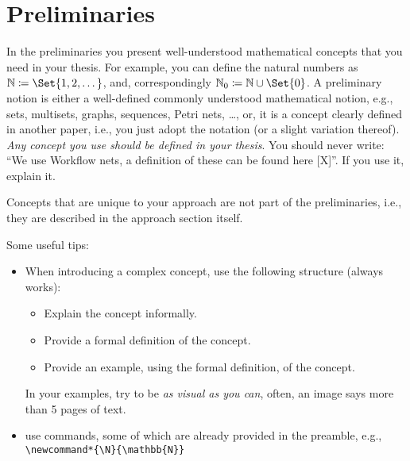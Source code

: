 \chapter{Preliminaries}
\label{chap:prelim}

In the preliminaries you present well-understood mathematical concepts that you need in your thesis.
For example, you can define the natural numbers as $\N\coloneqq\Set{1,2,\dots}$, and, correspondingly $\N_0\coloneqq\N\cup\Set{0}$.
A preliminary notion is either a well-defined commonly understood mathematical notion, e.g., sets, multisets, graphs, sequences, Petri nets, \dots, or, it is a concept clearly defined in another paper, i.e., you just adopt the notation (or a slight variation thereof).
\emph{Any concept you use should be defined in your thesis}.
You should never write: \enquote{We use Workflow nets, a definition of these can be found here [X]}.
If you use it, explain it.

Concepts that are unique to your approach are not part of the preliminaries, i.e., they are described in the approach section itself.

Some useful tips:
\begin{itemize}
	\item When introducing a complex concept, use the following structure (always works):
	      \begin{itemize}
		      \item Explain the concept informally.
		      \item Provide a formal definition of the concept.
		      \item Provide an example, using the formal definition, of the concept.
	      \end{itemize}
	      In your examples, try to be \emph{as visual as you can}, often, an image says more than 5 pages of text.
	\item use commands, some of which are already provided in the preamble, e.g.,\\
	\verb+\newcommand*{\N}{\mathbb{N}}+
\end{itemize}
